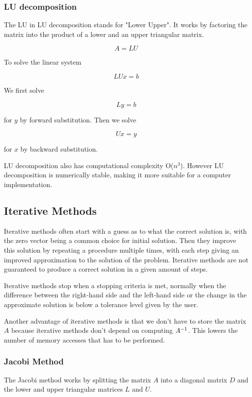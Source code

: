 \subsubsection*{LU decomposition}

The LU in LU decomposition stands for "Lower Upper". It works by factoring the 
matrix into the product of a lower and an upper triangular matrix. 

$$A = LU$$

To solve the linear system 

$$LUx = b$$

We first solve 

$$Ly = b$$

for $y$ by forward substitution. Then we solve 

$$Ux = y$$

for $x$ by backward substitution.

LU decomposition also has computational complexity O($n^3$). However LU decomposition 
is numerically stable, making it more suitable for a computer implementation.

\subsection*{Iterative Methods}

Iterative methods often start with a guess as to what the correct solution is, 
with the zero vector being a common choice for initial solution. Then they improve 
this solution by repeating a procedure multiple times, with each step 
giving an improved approximation to the solution of the problem. Iterative methods 
are not guaranteed to produce a correct solution in a given amount of steps. 

Iterative methods stop when a stopping criteria is met, normally when the difference 
between the right-hand side and the left-hand side or the change in the approximate 
solution is below a tolerance level given by the user. 

Another advantage of iterative methods is that we don't have to store the matrix 
$A$ because iterative methods don't depend on computing ${A}^{-1}$. This lowers 
the number of memory accesses that has to be performed. 

\subsubsection*{Jacobi Method}

The Jacobi method works by splitting the matrix $A$ into a diagonal matrix $D$ 
and the lower and upper triangular matrices $L$ and $U$. 

